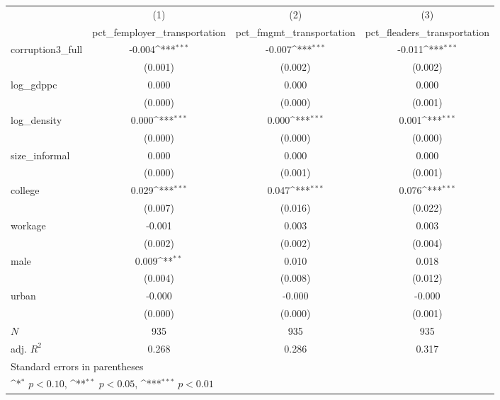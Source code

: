 {
\def\sym#1{\ifmmode^{#1}\else\(^{#1}\)\fi}
\begin{tabular}{l*{3}{c}}
\hline\hline
            &\multicolumn{1}{c}{(1)}&\multicolumn{1}{c}{(2)}&\multicolumn{1}{c}{(3)}\\
            &\multicolumn{1}{c}{pct\_femployer\_transportation}&\multicolumn{1}{c}{pct\_fmgmt\_transportation}&\multicolumn{1}{c}{pct\_fleaders\_transportation}\\
\hline
corruption3\_full&      -0.004\sym{***}&      -0.007\sym{***}&      -0.011\sym{***}\\
            &     (0.001)         &     (0.002)         &     (0.002)         \\
[1em]
log\_gdppc   &       0.000         &       0.000         &       0.000         \\
            &     (0.000)         &     (0.000)         &     (0.001)         \\
[1em]
log\_density &       0.000\sym{***}&       0.000\sym{***}&       0.001\sym{***}\\
            &     (0.000)         &     (0.000)         &     (0.000)         \\
[1em]
size\_informal&       0.000         &       0.000         &       0.000         \\
            &     (0.000)         &     (0.001)         &     (0.001)         \\
[1em]
college     &       0.029\sym{***}&       0.047\sym{***}&       0.076\sym{***}\\
            &     (0.007)         &     (0.016)         &     (0.022)         \\
[1em]
workage     &      -0.001         &       0.003         &       0.003         \\
            &     (0.002)         &     (0.002)         &     (0.004)         \\
[1em]
male        &       0.009\sym{**} &       0.010         &       0.018         \\
            &     (0.004)         &     (0.008)         &     (0.012)         \\
[1em]
urban       &      -0.000         &      -0.000         &      -0.000         \\
            &     (0.000)         &     (0.000)         &     (0.001)         \\
\hline
\(N\)       &         935         &         935         &         935         \\
adj. \(R^{2}\)&       0.268         &       0.286         &       0.317         \\
\hline\hline
\multicolumn{4}{l}{\footnotesize Standard errors in parentheses}\\
\multicolumn{4}{l}{\footnotesize \sym{*} \(p<0.10\), \sym{**} \(p<0.05\), \sym{***} \(p<0.01\)}\\
\end{tabular}
}
